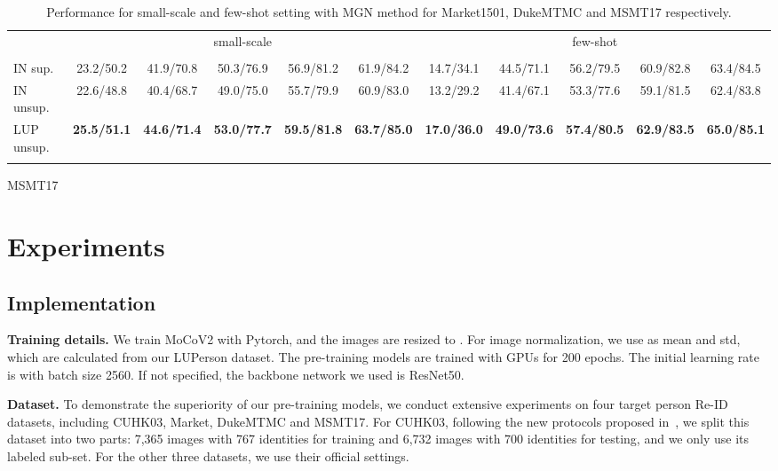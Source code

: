 \documentclass[final]{cvpr}
\begin{document}
\begin{table*}[h]
    \begin{subtable}[h]{1.0\textwidth}
        \centering
        \begin{tabular}{l|ccccc|ccccc}
        \shline
        \multirow{2}{*}{pre-train} & \multicolumn{5}{c|}{small-scale} & \multicolumn{5}{c}{few-shot} \\ \cline{2-11} &  &  &  &  &  &  &  &  &  &  \\ \hline
        IN sup.    & 23.2/50.2 & 41.9/70.8 & 50.3/76.9 & 56.9/81.2 & 61.9/84.2 & 14.7/34.1 & 44.5/71.1 & 56.2/79.5 & 60.9/82.8 & 63.4/84.5 \\ \hline
        IN unsup.  & 22.6/48.8 & 40.4/68.7 & 49.0/75.0 & 55.7/79.9 & 60.9/83.0 & 13.2/29.2 & 41.4/67.1 & 53.3/77.6 & 59.1/81.5 & 62.4/83.8 \\ \hline
        LUP unsup. & \textbf{25.5/51.1} & \textbf{44.6/71.4} & \textbf{53.0/77.7} & \textbf{59.5/81.8} & \textbf{63.7/85.0} & \textbf{17.0/36.0} & \textbf{49.0/73.6} & \textbf{57.4/80.5} & \textbf{62.9/83.5} & \textbf{65.0/85.1} \\ \shline
    \end{tabular}
    \vspace{-0.12cm}
    \caption{MSMT17}
    \label{tab:sd-fw-msmt}
    \end{subtable}
    \vspace{-2mm}
    \caption{Performance for small-scale and few-shot setting with MGN method for Market1501, DukeMTMC and MSMT17 respectively.}
    \label{tab:sd-fw}
\end{table*}

\section{Experiments}
\label{sec:exp}

\subsection{Implementation}
\noindent\textbf{Training details.} We train MoCoV2 with Pytorch, and the images are resized to . For image normalization, we use  as mean and std, which are calculated from our LUPerson dataset. The pre-training models are trained with  GPUs for 200 epochs. The initial learning rate is   with batch size 2560. If not specified, the backbone network we used is ResNet50.

\noindent\textbf{Dataset.} To demonstrate the superiority of our pre-training models, we conduct extensive experiments on four target person Re-ID datasets, including CUHK03, Market, DukeMTMC and MSMT17. For CUHK03, following the new protocols proposed in~\cite{zhong2017re}, we split this dataset into two parts: 7,365 images with 767 identities for training and 6,732 images with 700 identities for testing, and we only use its labeled sub-set. For the other three datasets, we use their official settings. 
\end{document}
